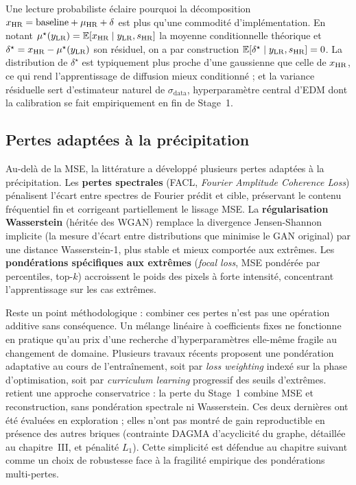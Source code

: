 Une lecture probabiliste éclaire pourquoi la décomposition $x_{\text{HR}} = \mathrm{baseline} + \mu_{\text{HR}} + \delta$ est plus qu'une commodité d'implémentation. En notant $\mu^{\star}(y_{\text{LR}}) = \mathbb{E}[x_{\text{HR}} \mid y_{\text{LR}}, s_{\text{HR}}]$ la moyenne conditionnelle théorique et $\delta^{\star} = x_{\text{HR}} - \mu^{\star}(y_{\text{LR}})$ son résiduel, on a par construction $\mathbb{E}[\delta^{\star} \mid y_{\text{LR}}, s_{\text{HR}}] = 0$. La distribution de $\delta^{\star}$ est typiquement plus proche d'une gaussienne que celle de $x_{\text{HR}}$, ce qui rend l'apprentissage de diffusion mieux conditionné ; et la variance résiduelle sert d'estimateur naturel de $\sigma_{\mathrm{data}}$, hyperparamètre central d'EDM dont la calibration se fait empiriquement en fin de Stage~1.

\label{sec:soa-pertes}

\subsection{Pertes adaptées à la précipitation}
\label{ssec:soa-pertes-precip}

Au-delà de la MSE, la littérature a développé plusieurs pertes adaptées à la précipitation. Les \textbf{pertes spectrales} (FACL, \emph{Fourier Amplitude Coherence Loss}) pénalisent l'écart entre spectres de Fourier prédit et cible, préservant le contenu fréquentiel fin et corrigeant partiellement le lissage MSE. La \textbf{régularisation Wasserstein} (héritée des WGAN) remplace la divergence Jensen-Shannon implicite (la mesure d'écart entre distributions que minimise le GAN original) par une distance Wasserstein-1, plus stable et mieux comportée aux extrêmes. Les \textbf{pondérations spécifiques aux extrêmes} (\emph{focal loss}, MSE pondérée par percentiles, top-$k$) accroissent le poids des pixels à forte intensité, concentrant l'apprentissage sur les cas extrêmes.

Reste un point méthodologique : combiner ces pertes n'est pas une opération additive sans conséquence. Un mélange linéaire à coefficients fixes ne fonctionne en pratique qu'au prix d'une recherche d'hyperparamètres elle-même fragile au changement de domaine. Plusieurs travaux récents proposent une pondération adaptative au cours de l'entraînement, soit par \emph{loss weighting} indexé sur la phase d'optimisation, soit par \emph{curriculum learning} progressif des seuils d'extrêmes. \Oracle{} retient une approche conservatrice : la perte du Stage~1 combine MSE et reconstruction, sans pondération spectrale ni Wasserstein. Ces deux dernières ont été évaluées en exploration ; elles n'ont pas montré de gain reproductible en présence des autres briques (contrainte DAGMA d'acyclicité du graphe, détaillée au chapitre~III, et pénalité $L_1$). Cette simplicité est défendue au chapitre suivant comme un choix de robustesse face à la fragilité empirique des pondérations multi-pertes.

